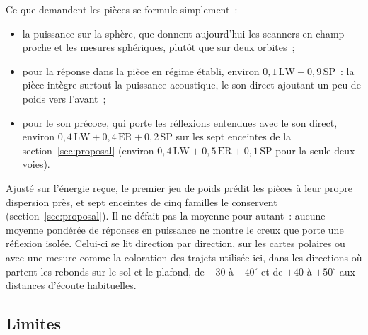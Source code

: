 \documentclass[11pt,a4paper]{article}
\begin{document}
Ce que demandent les pièces se formule simplement~:
\begin{itemize}
\item la puissance sur la sphère, que donnent aujourd'hui les scanners en champ proche et les mesures
sphériques, plutôt que sur deux orbites~;
\item pour la réponse dans la pièce en régime établi, environ $0,1\,\mathrm{LW} + 0,9\,\mathrm{SP}$~: la
pièce intègre surtout la puissance acoustique, le son direct ajoutant un peu de poids vers l'avant~;
\item pour le son précoce, qui porte les réflexions entendues avec le son direct, environ
$0,4\,\mathrm{LW} + 0,4\,\mathrm{ER} + 0,2\,\mathrm{SP}$ sur les sept enceintes de la
section~\ref{sec:proposal} (environ $0,4\,\mathrm{LW} + 0,5\,\mathrm{ER} + 0,1\,\mathrm{SP}$ pour la seule deux voies).
\end{itemize}
Ajusté sur l'énergie reçue, le premier jeu de poids prédit les pièces à leur propre dispersion près, et
sept enceintes de cinq familles le conservent (section~\ref{sec:proposal}). Il
ne défait pas la moyenne pour autant~: aucune moyenne pondérée de réponses en puissance ne montre le
creux que porte une réflexion isolée. Celui-ci se lit direction par direction, sur les cartes polaires
ou avec une mesure comme la coloration des trajets utilisée ici, dans les directions où partent les
rebonds sur le sol et le plafond, de $-30$ à $-40^\circ$ et de $+40$ à $+50^\circ$ aux distances d'écoute
habituelles.

\subsection{Limites}
\label{sec:limits}
\end{document}
